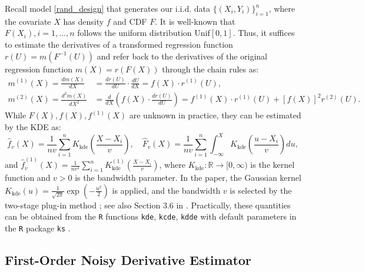 \documentclass{uwstat572}
\theoremstyle{definition}
\renewcommand{\hat}{\widehat}
\theoremstyle{theorem}
\begin{document}
Recall model \eqref{rand_design} that generates our i.i.d. data $\{(X_i,Y_i)\}_{i=1}^n$, where the covariate $X$ has density $f$ and CDF $F$. It is well-known \citep{casella2002statistical} that $F(X_i), i=1,...,n$ follows the uniform distribution $\mathrm{Unif}[0,1]$. Thus, it suffices to estimate the derivatives of a transformed regression function $r(U) = m(F^{-1}(U))$ and refer back to the derivatives of the original regression function $m(X) = r(F(X))$ through the chain rules as:
\begin{equation}
\label{back_transform}
\begin{split}
m^{(1)}(X)=\frac{d m(X)}{dX} &= \frac{d r(U)}{dU} \cdot \frac{dU}{d X} = f(X) \cdot r^{(1)}(U),\\
m^{(2)}(X)=\frac{d^2 m(X)}{dX^2} &= \frac{d}{dX}\left(f(X) \cdot \frac{dr(U)}{dU} \right) = f^{(1)}(X) \cdot r^{(1)}(U) + \left[f(X)\right]^2 r^{(2)}(U).
\end{split}
\end{equation}
While $F(X),f(X),f^{(1)}(X)$ are unknown in practice, they can be estimated by the KDE as:
\begin{equation}
\label{KDE}
\hat{f}_v(X)=\frac{1}{nv} \sum_{i=1}^n K_{\text{kde}}\left(\frac{X-X_i}{v}\right), \quad \hat{F}_v(X) = \frac{1}{nv} \sum_{i=1}^n \int_{-\infty}^X K_{\text{kde}}\left(\frac{u-X_i}{v}\right) du,
\end{equation} 
and $\hat{f}_v^{(1)}(X) = \frac{1}{nv^2} \sum\limits_{i=1}^n K_{\text{kde}}^{(1)}\left(\frac{X-X_i}{v}\right)$, where $K_{\text{kde}}:\mathbb{R}\to [0,\infty)$ is the kernel function and $v>0$ is the bandwidth parameter. In the paper, the Gaussian kernel $K_{\text{kde}}(u)=\frac{1}{\sqrt{2\pi}} \exp\left(-\frac{u^2}{2}\right)$ is applied, and the bandwidth $v$ is selected by the two-stage plug-in method \citep{sheather1991reliable}; see also Section 3.6 in \cite{wand1994kernel}. Practically, these quantities can be obtained from the \texttt{R} functions \texttt{kde}, \texttt{kcde}, \texttt{kdde} with default parameters in the \texttt{R} package \texttt{ks} \citep{ks2022R}.

\subsection{First-Order Noisy Derivative Estimator}
\end{document}
